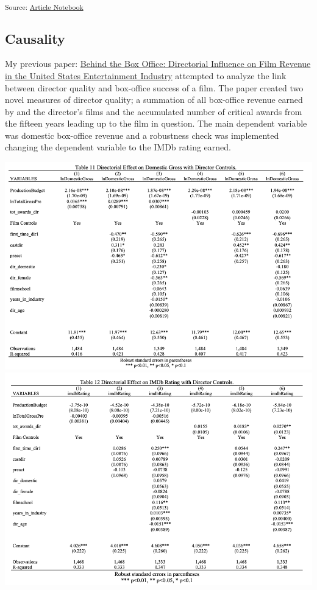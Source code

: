 \documentclass[
]{agujournal2019}
\begin{document}
\textsubscript{Source:
\href{https://ehealy19.github.io/Matching_Movies/index.qmd.html}{Article
Notebook}}

\subsection{Causality}\label{causality}

My previous paper: \href{./assets/thesis.pdf}{Behind the Box Office:
Directorial Influence on Film Revenue in the United States Entertainment
Industry} attempted to analyze the link between director quality and
box-office success of a film. The paper created two novel measures of
director quality; a summation of all box-office revenue earned by and
the director's films and the accumulated number of critical awards from
the fifteen years leading up to the film in question. The main dependent
variable was domestic box-office revenue and a robustness check was
implemented changing the dependent variable to the IMDb rating earned.

\includegraphics{./assets/thesis_table1.png}
\includegraphics{./assets/thesis_table2.png}
\end{document}
